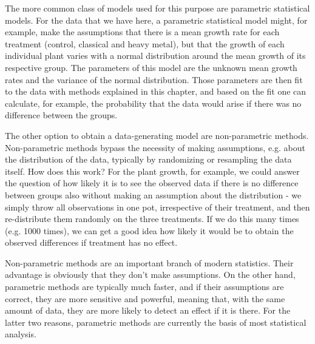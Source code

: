 \documentclass[a4paper,twoside]{tufte-book}\usepackage[]{graphicx}\usepackage[]{color}
\begin{document}
The more common class of models used for this purpose are parametric statistical models. For the data that we have here, a parametric statistical model might, for example, make the assumptions that there is a mean growth rate for each treatment (control, classical and heavy metal), but that the growth of each individual plant varies with a normal distribution around the mean growth of its respective group. The parameters of this model are the unknown mean growth rates and the variance of the normal distribution. Those parameters are then fit to the data with methods explained in this chapter, and based on the fit one can calculate, for example, the probability that the data would arise if there was no difference between the groups.

The other option to obtain a data-generating model are non-parametric methods. Non-parametric methods bypass the necessity of making assumptions, e.g. about the distribution of the data, typically by randomizing or resampling the data itself. How does this work? For the plant growth, for example, we could answer the question of how likely it is to see the observed data if there is no difference between groups also without making an assumption about the distribution - we simply throw all observations in one pot, irrespective of their treatment, and then re-distribute them randomly on the three treatments. If we do this many times (e.g. 1000 times), we can get a good idea how likely it would be to obtain the observed differences if treatment has no effect. 

Non-parametric methods are an important branch of modern statistics. Their advantage is obviously that they don't make assumptions. On the other hand, parametric methods are typically much faster, and if their assumptions are correct, they are more sensitive and powerful, meaning that, with the same amount of data, they are more likely to detect an effect if it is there. For the latter two reasons, parametric methods are currently the basis of most statistical analysis.
\end{document}
